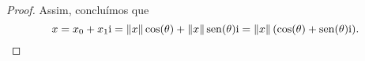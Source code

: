 \begin{proof}
Assim, concluímos que
	\begin{equation*}
	x = x_0 + x_1 \mathrm{i} = \left\Vert{x}\right\Vert\cos(\theta) + \left\Vert{x}\right\Vert\operatorname{sen}(\theta) \mathrm{i} = \left\Vert{x}\right\Vert(\cos(\theta) + \operatorname{sen}(\theta) \mathrm{i}).
	\qedhere
	\end{equation*}
\end{proof}

\begin{comment}

\begin{figure}
\centering
\begin{tikzpicture}[scale=2]
	\draw (-1,0) node[anchor=north] {$-1$} -- (0,0) node[anchor=north] {$0$} -- (1,0) node[anchor=north] {$1$};
	\draw (0,0) -- (0,pi/2) node[anchor=west] {$\displaystyle\frac{\tau}{4}$} -- (0,pi) node[anchor=west] {$\displaystyle\frac{\tau}{2}$};
	\draw[dotted] (1,0) -- (1,pi) -- (-1,pi) -- (-1,0);
	\draw plot [domain=0:pi,smooth] ({cos(\x r)},\x);
\end{tikzpicture}
\caption{Gráfico da função $\cos\inv\colon \intff{-1}{1} \to \intff{0}{\frac{\tau}{2}}$.}
\end{figure}

\begin{figure}
\centering
\begin{tikzpicture}[scale=2]
	\draw (-1,0) node[anchor=east] {$-1$} -- (0,0) node[anchor=east] {$0$} -- (1,0) node[anchor=west] {$1$};
	\draw (0,-pi/2) node[anchor=east] {$-\displaystyle\frac{\tau}{4}$} -- (0,pi/2) node[anchor=east] {$\displaystyle\frac{\tau}{4}$};
	\draw[dotted] (-1,-pi/2) rectangle (1,pi/2);
	\draw plot [domain=-pi/2:pi/2,smooth] ({sin(\x r)},\x);
\end{tikzpicture}
\caption{Gráfico da função $\sin\inv\colon \intff{-1}{1} \to \intff{-\frac{\tau}{4}}{\frac{\tau}{4}}$.}
\label{fig:senoinv}
\end{figure}


\begin{figure}
\centering
\begin{tikzpicture}[scale=1]
	\draw plot [domain=-1:1,smooth] (\x,{tan(\x r));
\end{tikzpicture}
\caption{Gráfico da função $\tan\inv\colon \R \to \intaa{\frac{\tau}{2}}{\frac{\tau}{2}}$.}
\end{figure}

\end{comment}




